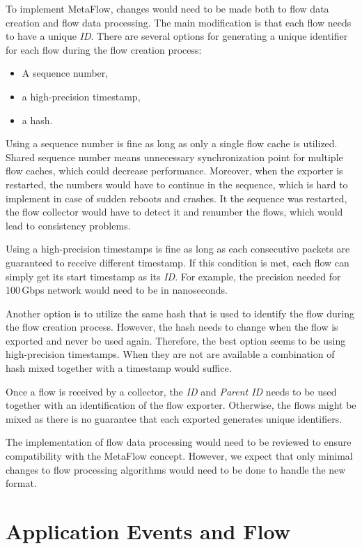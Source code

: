 To implement MetaFlow, changes would need to be made both to flow data creation and flow data processing. The main modification is that each flow needs to have a unique \emph{ID}. There are several options for generating a unique identifier for each flow during the flow creation process:
\begin{itemize}
    \item A sequence number,
    \item a high-precision timestamp,
    \item a hash.
\end{itemize}

Using a sequence number is fine as long as only a single flow cache is utilized. Shared sequence number means unnecessary synchronization point for multiple flow caches, which could decrease performance. Moreover, when the exporter is restarted, the numbers would have to continue in the sequence, which is hard to implement in case of sudden reboots and crashes. It the sequence was restarted, the flow collector would have to detect it and renumber the flows, which would lead to consistency problems.

Using a high-precision timestamps is fine as long as each consecutive packets are guaranteed to receive different timestamp. If this condition is met, each flow can simply get its start timestamp as its \emph{ID}. For example, the precision needed for 100\,Gbps network would need to be in nanoseconds.

Another option is to utilize the same hash that is used to identify the flow during the flow creation process. However, the hash needs to change when the flow is exported and never be used again. Therefore, the best option seems to be using high-precision timestamps. When they are not are available a combination of hash mixed together with a timestamp would suffice.

Once a flow is received by a collector, the \emph{ID} and \emph{Parent ID} needs to be used together with an identification of the flow exporter. Otherwise, the flows might be mixed as there is no guarantee that each exported generates unique identifiers.

The implementation of flow data processing would need to be reviewed to ensure compatibility with the MetaFlow concept. However, we expect that only minimal changes to flow processing algorithms would need to be done to handle the new format.

\section{Application Events and Flow}\label{sec:app-events}


